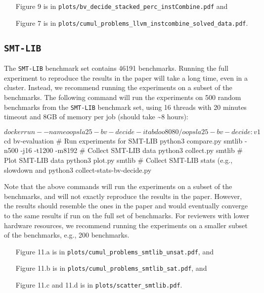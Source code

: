 \documentclass[acmlarge, nonacm]{acmart}
\begin{document}
\begin{itemize}
  \item[Figure 9] is in \texttt{plots/bv\_decide\_stacked\_perc\_instCombine.pdf} and
  \item[Figure 7] is in \texttt{plots/cumul\_problems\_llvm\_instcombine\_solved\_data.pdf}.
\end{itemize}

\subsection{\texttt{SMT-LIB}}

The \texttt{SMT-LIB} benchmark set contains 46191 benchmarks. Running the full experiment to reproduce the results in the paper will take a long time, even in a cluster. Instead, we recommend running the experiments on a subset of the benchmarks. The following command will run the experiments on 500 random benchmarks from the \texttt{SMT-LIB} benchmark set, using 16 threads with 20 minutes timeout and 8GB of memory per job (should take \textasciitilde 8 hours):

\begin{script}
$ docker run --name oopsla25-bv-decide -it abdoo8080/oopsla25-bv-decide:v1
$ cd bv-evaluation
# Run experiments for SMT-LIB
python3 compare.py smtlib -n500 -j16 -t1200 -m8192
# Collect SMT-LIB data
python3 collect.py smtlib
# Plot SMT-LIB data
python3 plot.py smtlib
# Collect SMT-LIB stats (e.g., slowdown and %
python3 collect-stats-bv-decide.py
\end{script}

Note that the above commands will run the experiments on a subset of the benchmarks, and will not exactly reproduce the results in the paper. However, the results should resemble the ones in the paper and would eventually converge to the same results if run on the full set of benchmarks. For reviewers with lower hardware resources, we recommend running the experiments on a smaller subset of the benchmarks, e.g., 200 benchmarks.

\begin{itemize}
  \item[Figure 11.a] is in \texttt{plots/cumul\_problems\_smtlib\_unsat.pdf}, and
  \item[Figure 11.b] is in \texttt{plots/cumul\_problems\_smtlib\_sat.pdf}, and
  \item[Figure 11.c and 11.d] is in \texttt{plots/scatter\_smtlib.pdf}.
\end{itemize}
\end{document}
